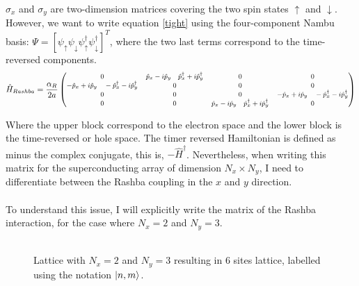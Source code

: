 \documentclass[letterpaper,12pt]{article}
\begin{document}
$\sigma_x$ and $\sigma_y$ are two-dimension matrices covering the two spin states $\uparrow$ and $\downarrow$. 
However, we want to write equation \ref{tight} using the four-component Nambu basis: $\Psi = [\psi_\uparrow \psi_\downarrow \psi_\uparrow^\dagger \psi_\downarrow^\dagger]^T$, where the two last terms correspond to the time-reversed components. 
\begin{equation}
\footnotesize
\hat{H}_{Rashba} = \frac{\alpha_R}{2a}
    \begin{pmatrix}
    0 & \hat{p}_x - i\hat{p}_y\quad\hat{p}_x^\dagger + i\hat{p}_y^\dagger & 0 & 0\\
    -\hat{p}_x + i\hat{p}_y\quad-\hat{p}_x^\dagger - i\hat{p}_y^\dagger & 0 & 0 & 0\\
    0 & 0 & 0 & -\hat{p}_x + i\hat{p}_y\quad-\hat{p}_x^\dagger - i\hat{p}_y^\dagger\\
    0 & 0 & \hat{p}_x - i\hat{p}_y\quad\hat{p}_x^\dagger + i\hat{p}_y^\dagger & 0
    \end{pmatrix}
\end{equation}

Where the upper block correspond to the electron space and the lower block is the time-reversed or hole space. The timer reversed Hamiltonian is defined as minus the complex conjugate, this is, $ - \hat{H}^\dagger$. Nevertheless, when writing this matrix for the superconducting array of dimension $N_x \times N_y$, I need to differentiate between the Rashba coupling in the $x$ and $y$ direction.\\ \\
To understand this issue, I will explicitly write the matrix of the Rashba interaction, for the case where $N_x = 2$ and $N_y = 3$.\\ \\
\begin{figure}[h!]
\centering
{} 
\label{diagram}
\caption{\footnotesize Lattice with $N_x = 2$ and $N_y = 3$ resulting in 6 sites lattice, labelled using the notation $\ket{n, m}$.}
\end{figure}
\end{document}
